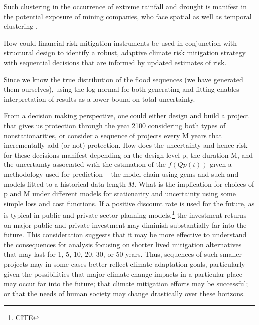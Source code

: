 \documentclass[12pt]{article}
\begin{document}
Such clustering in the occurrence of extreme rainfall and drought is manifest in the potential exposure of mining companies, who face spatial as well as temporal clustering \citep{Bonnafous2017a,Bonnafous2017b}.

How could  financial risk mitigation instruments be used in conjunction with structural design to identify a robust, adaptive climate risk mitigation strategy with sequential decisions that are informed by updated estimates of risk.

Since we know the true distribution of the flood sequences (we have generated them ourselves), using the log-normal for both generating and fitting enables interpretation of results as a lower bound on total uncertainty.

From a decision making perspective, one could either design and build a project that gives us protection through the year 2100 considering both types of nonstationarities, or consider a sequence of projects every M years that incrementally add (or not) protection. How does the uncertainty and hence risk for these decisions manifest depending on the design level p, the duration M, and the uncertainty associated with the estimation of the \( f(Qp(t)) \) given a methodology used for prediction -- \eg{} the model chain using gcms and such and models fitted to a historical data length $M$.
What is the implication for choices of p and M under different models for stationarity and uncertainty using some simple loss and cost  functions.
If a positive discount rate is used for the future, as is typical in public and private sector planning models,\footnote{CITE} the investment returns on major public and private investment may diminish substantially far into the future.
This consideration suggests that it may be more effective to understand the consequences for analysis focusing on shorter lived mitigation alternatives that may last for 1, 5, 10, 20, 30, or 50 years.
Thus, sequences of such smaller projects may in some cases better reflect climate adaptation goals, particularly given the possibilities that major climate change impacts in a particular place may occur far into the future; that climate mitigation efforts may be successful; or that the needs of human society may change drastically over these horizons.
\end{document}
